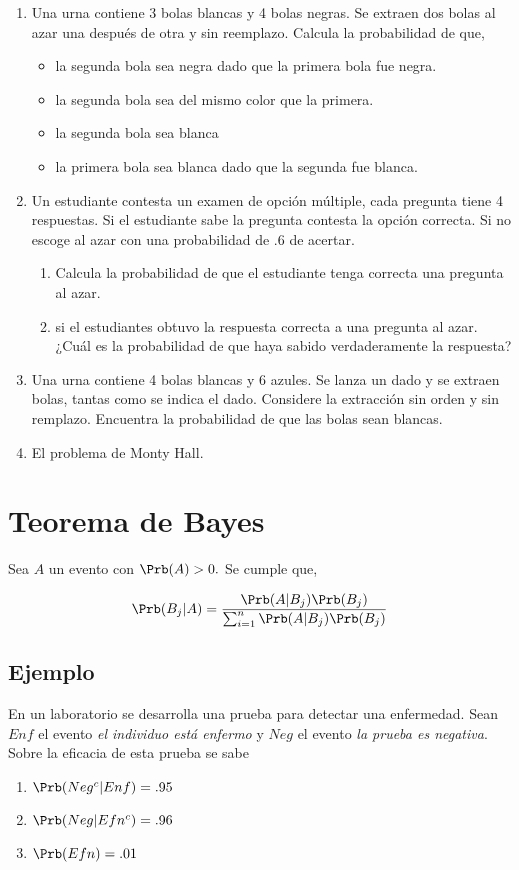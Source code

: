 \documentclass{assignment}
\begin{document}
\begin{enumerate}
	\item Una urna contiene 3 bolas blancas y 4 bolas negras. Se extraen dos bolas al azar una después de otra y sin reemplazo. Calcula la probabilidad de que,
	
	\begin{itemize}
		\item la segunda bola sea negra dado que la primera bola fue negra. 
		\item la segunda bola sea del mismo color que la primera.
		 \item la segunda bola sea blanca
		 \item la primera bola sea blanca dado que la segunda fue blanca. 
		 
	\end{itemize}
	
	\item Un estudiante contesta un examen de opción múltiple, cada pregunta tiene 4 respuestas. Si el estudiante sabe la pregunta contesta la opción correcta. Si no escoge al azar con una probabilidad de .6 de acertar. 
	
	\begin{enumerate}
		\item Calcula la probabilidad  de que el estudiante tenga correcta una pregunta al azar. 
		\item si el estudiantes obtuvo la respuesta correcta a una pregunta al azar. ¿Cuál es la probabilidad de que haya sabido verdaderamente la respuesta? 
	\end{enumerate}
	
	\item Una urna contiene 4 bolas blancas y 6 azules. Se lanza un dado y se extraen bolas, tantas como se indica el dado. Considere la extracción sin orden y sin remplazo. Encuentra la probabilidad de que las bolas sean blancas. 
	\item El problema de Monty Hall.
	
\end{enumerate}



\section{Teorema de Bayes}
Sea $A$ un evento con $\Prb(A)>0.$ Se cumple que,

\[
\Prb(B_j|A) = \frac{\Prb(A|B_j)\Prb(B_j)}{\sum_{i=1}^n\Prb(A|B_j)\Prb(B_j)}
\]

\subsection*{Ejemplo}
En un laboratorio se desarrolla una prueba para detectar una enfermedad. Sean $Enf$ el evento \emph{el individuo está enfermo} y $Neg$ el evento \emph{la prueba es negativa}. Sobre la eficacia de esta prueba se sabe
\begin{enumerate}
	\item $\Prb (Neg^c | Enf)=.95$
	\item $\Prb (Neg | Efn^c)=.96$
	\item $\Prb (Efn)=.01$
\end{enumerate}
\end{document}
